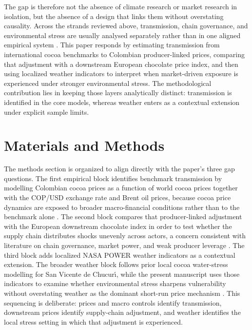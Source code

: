\documentclass[11pt]{article}
\begin{document}
The gap is therefore not the absence of climate research or market research in isolation, but the absence of a design that links them without overstating causality. Across the strands reviewed above, transmission, chain governance, and environmental stress are usually analysed separately rather than in one aligned empirical system \citep{TsowouGayi2019,Schroth2016,Mithofer2017}. This paper responds by estimating transmission from international cocoa benchmarks to Colombian producer-linked prices, comparing that adjustment with a downstream European chocolate price index, and then using localized weather indicators to interpret when market-driven exposure is experienced under stronger environmental stress. The methodological contribution lies in keeping those layers analytically distinct: transmission is identified in the core models, whereas weather enters as a contextual extension under explicit sample limits.
\section{Materials and Methods}
\label{sec:methods}

The methods section is organized to align directly with the paper's three gap questions. The first empirical block identifies benchmark transmission by modelling Colombian cocoa prices as a function of world cocoa prices together with the COP/USD exchange rate and Brent oil prices, because cocoa price dynamics are exposed to broader macro-financial conditions rather than to the benchmark alone \citep{Jumah2001,JimenezRodriguez2022}. The second block compares that producer-linked adjustment with the European downstream chocolate index in order to test whether the supply chain distributes shocks unevenly across actors, a concern consistent with literature on chain governance, market power, and weak producer leverage \citep{Gereffi2005,Mithofer2017,Merkle2021}. The third block adds localized NASA POWER weather indicators as a contextual extension. The broader weather block follows prior local cocoa water-stress modelling for San Vicente de Chucur\'{\i}, while the present manuscript uses those indicators to examine whether environmental stress sharpens vulnerability without overstating weather as the dominant short-run price mechanism \citep{Turner2003,talero_sarmiento_etal_2025,Lahive2019}. This sequencing is deliberate: prices and macro controls identify transmission, downstream prices identify supply-chain adjustment, and weather identifies the local stress setting in which that adjustment is experienced.
\end{document}

